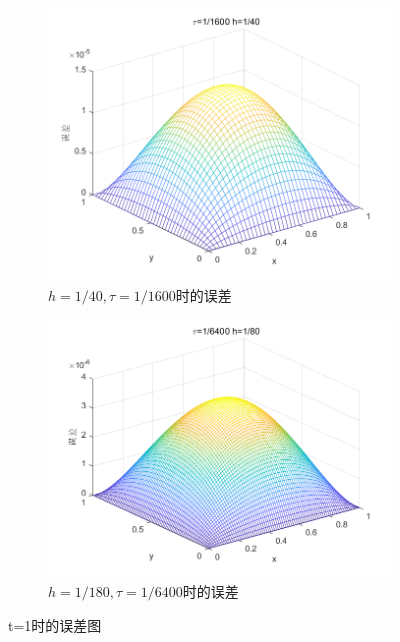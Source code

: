\documentclass[withoutpreface,bwprint]{cumcmthesis} %
\begin{document}
\begin{figure}
	\begin{subfigure}[b]{0.475\textwidth}   
		\centering 
		\includegraphics[width=\textwidth]{figures/f4}
		\caption[]%
		{{\small $h=1/40,\tau=1/1600$时的误差}}    
		\label{fig:mean and std of net34}
	\end{subfigure}
	\quad
	\begin{subfigure}[b]{0.475\textwidth}   
		\centering 
		\includegraphics[width=\textwidth]{figures/f5}
		\caption[]%
		{{\small $h=1/180,\tau=1/6400$时的误差}}    
		\label{fig:mean and std of net44}
	\end{subfigure}
	\caption[ The average and standard deviation of critical parameters ]
	{t=1时的误差图} 
	\label{fig:2}
\end{figure}
	
\end{document}
